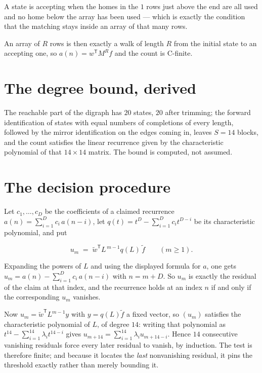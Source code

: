 \documentclass[11pt]{article}
\theoremstyle{definition}
\begin{document}
A state is accepting when the homes in the $1$ rows just above the end are all used and no home below the array has been used --- which is exactly the condition that the matching stays inside an array of that many rows.

An array of $R$ rows is then exactly a walk of length $R$ from the initial state to an accepting one, so $a(n) = w^{\mathsf T}M^{R}f$ and the count is C-finite.

\section{The degree bound, derived}

The reachable part of the digraph has $20$ states, $20$ after trimming; the forward identification of states with equal numbers of completions of every length, followed by the mirror identification on the edges coming in, leaves $S = 14$ blocks, and the count satisfies the linear recurrence given by the characteristic polynomial of that $14\times14$ matrix. The bound is computed, not assumed.

\section{The decision procedure}

Let $c_1,\dots,c_D$ be the coefficients of a claimed recurrence $a(n) = \sum_{i=1}^{D} c_i\,a(n-i)$, let $q(t) = t^{D} - \sum_{i=1}^{D} c_i t^{D-i}$ be its characteristic polynomial, and put

\[u_m \;=\; \tilde w^{\mathsf T} L^{\,m-1} q(L)\,\tilde f \qquad (m \ge 1).\]

Expanding the powers of $L$ and using the displayed formula for $a$, one gets $u_m = a(n) - \sum_{i=1}^{D} c_i\,a(n-i)$ with $n = m + D$. So $u_m$ is exactly the residual of the claim at that index, and the recurrence holds at an index $n$ if and only if the corresponding $u_m$ vanishes.

Now $u_m = \tilde w^{\mathsf T} L^{m-1} y$ with $y = q(L)\tilde f$ a fixed vector, so $(u_m)$ satisfies the characteristic polynomial of $L$, of degree $14$: writing that polynomial as $t^{14} - \sum_{i=1}^{14} \lambda_i t^{14-i}$ gives $u_{m+14} = \sum_{i=1}^{14} \lambda_i u_{m+14-i}$. Hence $14$ consecutive vanishing residuals force every later residual to vanish, by induction. The test is therefore finite; and because it locates the {\itshape last} nonvanishing residual, it pins the threshold exactly rather than merely bounding it.
\end{document}
